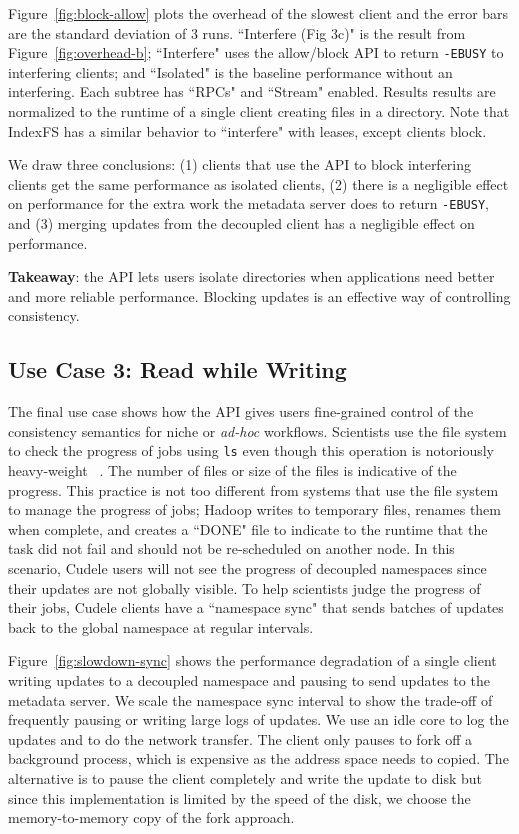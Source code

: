 Figure~\ref{fig:block-allow} plots the overhead of the slowest client and the
error bars are the standard deviation of 3 runs.  ``Interfere (Fig 3c)" is the
result from Figure~\ref{fig:overhead-b}; ``Interfere" uses the allow/block API
to return \texttt{-EBUSY} to interfering clients; and ``Isolated" is the
baseline performance without an interfering. Each subtree has ``RPCs" and
``Stream" enabled.  Results results are normalized to the runtime of a single
client creating files in a directory. Note that IndexFS has a similar behavior
to ``interfere" with leases, except clients block. 

We draw three conclusions: (1) clients that use the API to block interfering
clients  get the same performance as isolated clients, (2) there is a
negligible effect on performance for the extra work the metadata server does to
return \texttt{-EBUSY}, and (3) merging updates from the decoupled client has a
negligible effect on performance.

\textbf{Takeaway}: the API lets users isolate directories when applications
need better and more reliable performance. Blocking updates is an effective way of
controlling consistency.

\subsection{Use Case 3: Read while Writing}

The final use case shows how the API gives users fine-grained control of the
consistency semantics for niche or {\it ad-hoc} workflows.  Scientists use the
file system to check the progress of jobs using \texttt{ls} even though this
operation is notoriously heavy-weight~\cite{carns:ipdps09-pvfs,
eshel:fast10-panache} . The number of files or size of the files is indicative
of the progress. This practice is not too different from systems that use the
file system to manage the progress of jobs; Hadoop writes to temporary files,
renames them when complete, and creates a ``DONE" file to indicate to the
runtime that the task did not fail and should not be re-scheduled on another
node. In this scenario, Cudele users will not see the progress of decoupled
namespaces since their updates are not globally visible.  To help scientists
judge the progress of their jobs, Cudele clients have a ``namespace sync" that
sends batches of updates back to the global namespace at regular intervals.

Figure~\ref{fig:slowdown-sync} shows the performance degradation of a single
client writing updates to a decoupled namespace and pausing to send updates to
the metadata server. We scale the namespace sync interval to show the trade-off
of frequently pausing or writing large logs of updates.  We use an idle core to
log the updates and to do the network transfer. The client only pauses to fork
off a background process, which is expensive as the address space needs to
copied. The alternative is to pause the client completely and write the update
to disk but since this implementation is limited by the speed of the disk, we
choose the memory-to-memory copy of the fork approach.

